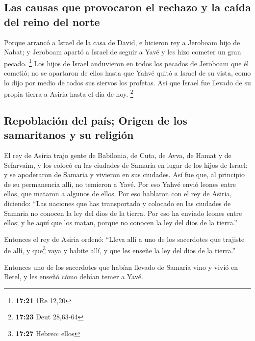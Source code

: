 \hypertarget{las-causas-que-provocaron-el-rechazo-y-la-cauxedda-del-reino-del-norte}{%
\subsection{Las causas que provocaron el rechazo y la caída del reino
del
norte}\label{las-causas-que-provocaron-el-rechazo-y-la-cauxedda-del-reino-del-norte}}

 Porque arrancó a Israel de la casa de David, e hicieron
rey a Jeroboam hijo de Nabat; y Jeroboam apartó a Israel de seguir a
Yavé y les hizo cometer un gran pecado. \footnote{\textbf{17:21} 1Re
  12,20}  Los hijos de Israel anduvieron en todos los
pecados de Jeroboam que él cometió; no se apartaron de ellos
 hasta que Yahvé quitó a Israel de su vista, como lo dijo
por medio de todos sus siervos los profetas. Así que Israel fue llevado
de su propia tierra a Asiria hasta el día de hoy. \footnote{\textbf{17:23}
  Deut 28,63-64}

\hypertarget{repoblaciuxf3n-del-pauxeds-origen-de-los-samaritanos-y-su-religiuxf3n}{%
\subsection{Repoblación del país; Origen de los samaritanos y su
religión}\label{repoblaciuxf3n-del-pauxeds-origen-de-los-samaritanos-y-su-religiuxf3n}}

 El rey de Asiria trajo gente de Babilonia, de Cuta, de
Avva, de Hamat y de Sefarvaim, y los colocó en las ciudades de Samaria
en lugar de los hijos de Israel; y se apoderaron de Samaria y vivieron
en sus ciudades.  Así fue que, al principio de su
permanencia allí, no temieron a Yavé. Por eso Yahvé envió leones entre
ellos, que mataron a algunos de ellos.  Por eso hablaron
con el rey de Asiria, diciendo: ``Las naciones que has transportado y
colocado en las ciudades de Samaria no conocen la ley del dios de la
tierra. Por eso ha enviado leones entre ellos; y he aquí que los matan,
porque no conocen la ley del dios de la tierra.''

 Entonces el rey de Asiria ordenó: ``Lleva allí a uno de
los sacerdotes que trajiste de allí, y que\footnote{\textbf{17:27}
  Hebreo: ellos} vaya y habite allí, y que les enseñe la ley del dios de
la tierra.''

 Entonces uno de los sacerdotes que habían llevado de
Samaria vino y vivió en Betel, y les enseñó cómo debían temer a Yavé.

